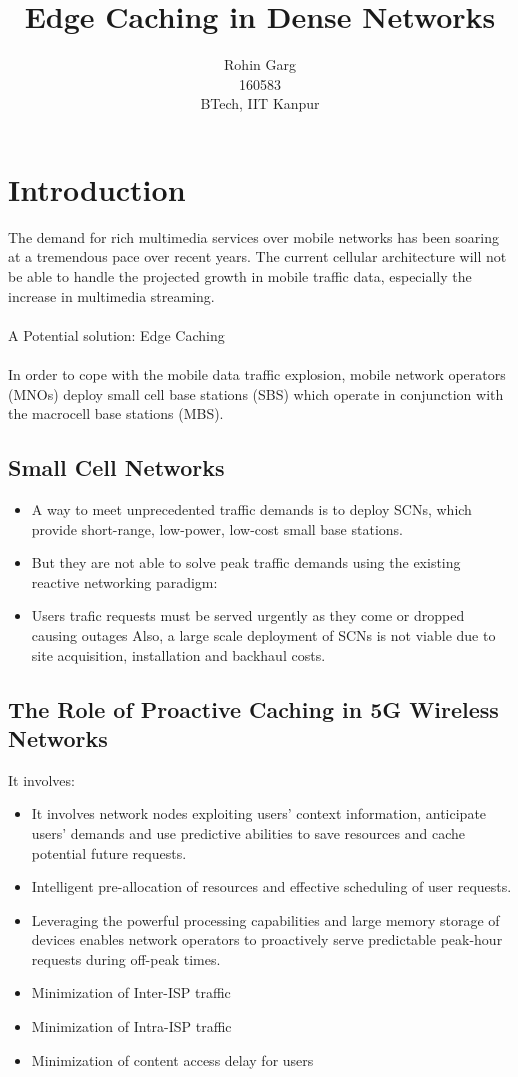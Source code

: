 \documentclass[]{article} %
\title{Edge Caching in Dense Networks}
\author{
Rohin Garg\\
160583\\
BTech, IIT Kanpur
}
\begin{document}
\maketitle

\section*{Introduction}
The demand for rich multimedia services over mobile networks has been soaring at a tremendous pace over recent years. The current cellular architecture will not be able to handle the projected growth in mobile traffic data, especially the increase in multimedia streaming.\\\\ 
A Potential solution: Edge Caching\\\\
In order to cope with the mobile data traffic explosion, mobile network operators (MNOs) deploy small cell base stations (SBS) which operate in conjunction with the macrocell base stations (MBS).
\subsection*{Small Cell Networks}
\begin{itemize}
    \item A way to meet unprecedented traffic demands is to deploy SCNs, which provide short-range, low-power, low-cost small base stations.
    \item But they are not able to solve peak traffic demands using the existing reactive networking paradigm: 
\item Users trafic requests must be served urgently as they come or dropped causing outages Also, a large scale deployment of SCNs is not viable due to site acquisition, installation and backhaul costs.

\end{itemize}

\subsection*{The Role of Proactive Caching in 5G Wireless Networks}
It involves:
\begin{itemize}
    \item It involves network nodes exploiting users’ context information, anticipate users’ demands and use predictive abilities to save resources and cache potential future requests. 
    \item Intelligent pre-allocation of resources and effective scheduling of user requests.
    \item Leveraging the powerful processing capabilities and large memory storage of devices enables network operators to proactively serve predictable peak-hour requests during off-peak times.
    \item Minimization of Inter-ISP traffic
    \item Minimization of Intra-ISP traffic
    \item Minimization of content access delay for users

\end{itemize}
\end{document}
